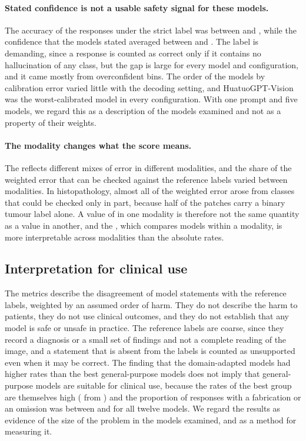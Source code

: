 \paragraph{Stated confidence is not a usable safety signal for these models.} The accuracy of the responses under the strict label was between  and , while the confidence that the models stated averaged between  and . The label is demanding, since a response is counted as correct only if it contains no hallucination of any class, but the gap is large for every model and configuration, and it came mostly from overconfident bins. The order of the models by calibration error varied little with the decoding setting, and HuatuoGPT-Vision was the worst-calibrated model in every configuration. With one prompt and five models, we regard this as a description of the models examined and not as a property of their weights.

\paragraph{The modality changes what the score means.} The \SMHR{} reflects different mixes of error in different modalities, and the share of the weighted error that can be checked against the reference labels varied between modalities. In histopathology, almost all of the weighted error arose from classes that could be checked only in part, because half of the patches carry a binary tumour label alone. A value of \SMHR{} in one modality is therefore not the same quantity as a value in another, and the \SRI{}, which compares models within a modality, is more interpretable across modalities than the absolute rates.

\subsection{Interpretation for clinical use}\label{sec:disc_clinical}
The metrics describe the disagreement of model statements with the reference labels, weighted by an assumed order of harm. They do not describe the harm to patients, they do not use clinical outcomes, and they do not establish that any model is safe or unsafe in practice. The reference labels are coarse, since they record a diagnosis or a small set of findings and not a complete reading of the image, and a statement that is absent from the labels is counted as unsupported even when it may be correct. The finding that the domain-adapted models had higher rates than the best general-purpose models does not imply that general-purpose models are suitable for clinical use, because the rates of the best group are themselves high (\SMHR{} from ) and the proportion of responses with a fabrication or an omission was between  and  for all twelve models. We regard the results as evidence of the size of the problem in the models examined, and as a method for measuring it.
